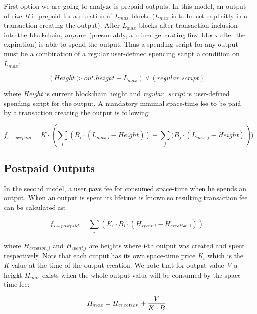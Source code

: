 \documentclass[]{llncs}   %
\newcommand{\authnote}[2]{\marginpar{\parbox{\marginparwidth}{\tiny %
  \textsf{#1 {\textcolor{blue}{notes: #2}}}}}%
  \textcolor{blue}{\textbf{\dag}}}
\newcommand{\authnote}[2]{
  \textsf{#1 \textcolor{blue}{: #2}}}
\newcommand{\authnote}[2]{}
\newcommand{\knote}[1]{{\authnote{\textcolor{green}{Alex notes}}{#1}}}
\begin{document}
First option we are going to analyze is prepaid outputs. In this model, an output of size \textit{B} is prepaid for a duration of $L_{max}$ blocks ($L_{max}$ is to be set explicitly in a transaction creating the output). After $L_{max}$ blocks after transaction inclusion into the blockchain, anyone~(presumably, a miner generating first block after the expiration) is able to spend the output. Thus a spending script for any output must be a combination of a regular user-defined spending script a condition on $L_{max}$:

\begin{equation}
(Height > out.height + L_{max}) \lor (regular\_script)
\end{equation}

where \textit{Height} is current blockchain height and {\em regular\_script} is user-defined spending script for the output. A mandatory minimal space-time fee to be paid by a transaction creating the output is following:

\begin{equation}
f_{s-prepaid} = K \cdot (\sum_i{(B_i \cdot (L_{max\_i} - Height))} - \sum_j{(B_j \cdot (L_{max\_j} - Height)}))
\end{equation}


\subsection{Postpaid Outputs}
\label{sec-postpaid}

In the second model, a user pays fee for consumed space-time when he spends an output. When an output is spent its lifetime is known so resulting transaction fee can be calculated as:

\begin{equation}
f_{s-postpaid} = \sum_i{(K_i \cdot B_i \cdot (H_{spent\_i} - H_{creation\_i}))}
\end{equation}

where $H_{creation\_i}$ and $H_{spent\_i}$ are heights where i-th output was created and spent respectively. Note that each output has its own space-time price \textit{$K_i$} which is the \textit{K} value at the time of the output creation. We note that for output value \textit{V} a height \textit{$H_{max}$} exists when the whole output value will be consumed by the space-time fee:

\begin{equation}
H_{max} = {H_{creation} + {V \over {K \cdot B}}}
\end{equation}
\end{document}
